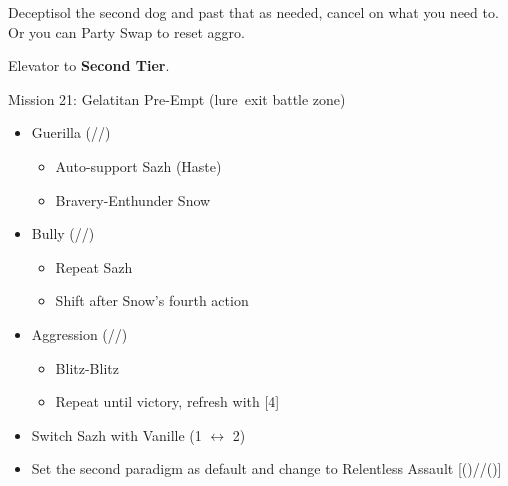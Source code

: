 \renewcommand{\first}{[1] Guerilla (\syn/\sab/\rav)}
\renewcommand{\second}{[2] Devastation (\com/\sab/\com)}
\renewcommand{\third}{[3] Hero's Charge (\syn/\med/\com)}
\renewcommand{\fourth}{[4] Tireless Charge (\com/\med/\com)}
\renewcommand{\fifth}{[5] Bully (\syn/\sab/\com)}
\renewcommand{\sixth}{[6] Aggression (\com/\rav/\com)}
	Deceptisol the second dog and past that as needed, cancel on what you need to. Or you can Party Swap to reset aggro.

	Elevator to \textbf{Second Tier}.
	\begin{battle}[0:40]{Mission 21: Gelatitan Pre-Empt (lure\, exit battle zone)}
		\begin{itemize}
			\item \first
			      \begin{itemize}
				      \item Auto-support Sazh (Haste)
				      \item Bravery-Enthunder Snow
			      \end{itemize}
			\item \fifth
			      \begin{itemize}
				      \item Repeat Sazh
				      \item Shift after Snow's fourth action
			      \end{itemize}
			\item \sixth
			      \begin{itemize}
				      \item Blitz-Blitz
				      \item Repeat until victory, refresh with [4]
			      \end{itemize}
		\end{itemize}
		\itemdrop{0.3}{Aegisol}
	\end{battle}
	\vfill
	\begin{menu}
		\begin{itemize}
			\paradigm
			\begin{itemize}
				\item Switch Sazh with Vanille (1 $\leftrightarrow$ 2)
				\item Set the second paradigm as default and change to Relentless Assault [(\rav)/\com/(\rav)]
			\end{itemize}
		\end{itemize}
	\end{menu}
	\renewcommand{\second}{[2] Relentless Assault (\rav/\com/\rav)}
	
